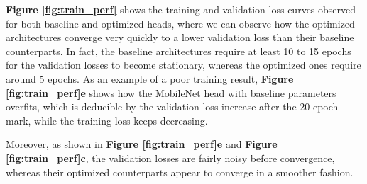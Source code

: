 \noindent
\textbf{Figure \ref{fig:train_perf}} shows the training and validation loss curves observed for both baseline and optimized heads, where we can observe how the optimized architectures converge very quickly to a lower validation loss than their baseline counterparts. In fact, the baseline architectures require at least 10 to 15 epochs for the validation losses to become stationary, whereas the optimized ones require around 5 epochs. As an example of a poor training result, \textbf{Figure \ref{fig:train_perf}e} shows how the MobileNet head with baseline parameters overfits, which is deducible by the validation loss increase after the 20 epoch mark, while the training loss keeps decreasing. 

\noindent
Moreover, as shown in \textbf{Figure \ref{fig:train_perf}e} and \textbf{Figure \ref{fig:train_perf}c}, the validation losses are fairly noisy before convergence, whereas their optimized counterparts appear to converge in a smoother fashion.  


